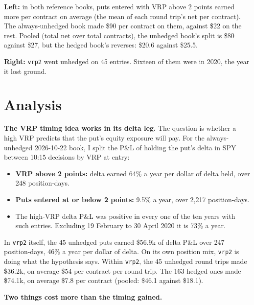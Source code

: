 \documentclass{article}
\begin{document}
\textbf{Left:} in both reference books, puts entered with VRP above 2 points earned more per contract on average (the mean of each round trip's net per contract). The always-unhedged book made \$90 per contract on them, against \$22 on the rest. Pooled (total net over total contracts), the unhedged book's split is \$80 against \$27, but the hedged book's reverses: \$20.6 against \$25.5.

\textbf{Right:} \texttt{vrp2} went unhedged on 45 entries. Sixteen of them were in 2020, the year it lost ground.

\section{Analysis}

\textbf{The VRP timing idea works in its delta leg.} The question is whether a high VRP predicts that the put's equity exposure will pay. For the always-unhedged 2026-10-22 book, I split the P\&L of holding the put's delta in SPY between 10:15 decisions by VRP at entry:

\begin{itemize}

\item \textbf{VRP above 2 points:} delta earned 64\% a year per dollar of delta held, over 248 position-days.

\item \textbf{Puts entered at or below 2 points:} 9.5\% a year, over 2,217 position-days.

\item The high-VRP delta P\&L was positive in every one of the ten years with such entries. Excluding 19 February to 30 April 2020 it is 73\% a year.

\end{itemize}

In \texttt{vrp2} itself, the 45 unhedged puts earned \$56.9k of delta P\&L over 247 position-days, 46\% a year per dollar of delta. On its own position mix, \texttt{vrp2} is doing what the hypothesis says. Within \texttt{vrp2}, the 45 unhedged round trips made \$36.2k, on average \$54 per contract per round trip. The 163 hedged ones made \$74.1k, on average \$7.8 per contract (pooled: \$46.1 against \$18.1).

\textbf{Two things cost more than the timing gained.}
\end{document}
